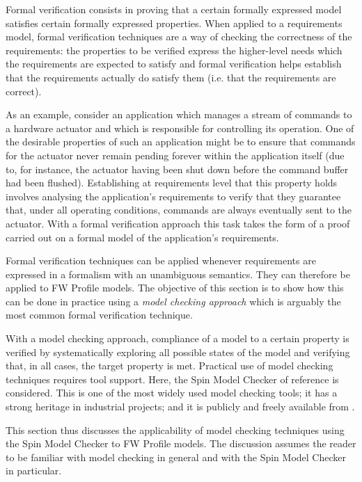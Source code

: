 \documentclass[a4paper,10pt]{article}
\begin{document}
Formal verification consists in proving that a certain formally expressed model satisfies certain formally expressed properties. When applied to a requirements model, formal verification techniques are a way of checking the correctness of the requirements: the properties to be verified express the higher-level needs which the requirements are expected to satisfy and formal verification helps establish that the requirements actually do satisfy them (i.e. that the requirements are correct). 

As an example, consider an application which manages a stream of commands to a hardware actuator and which is responsible for controlling its operation. One of the desirable properties of such an application might be to ensure that commands for the actuator never remain pending forever within the application itself (due to, for instance, the actuator having been shut down before the command buffer had been flushed). Establishing at requirements level that this property holds involves analysing the application's requirements to verify that they guarantee that, under all operating conditions, commands are always eventually sent to the actuator. With a formal verification approach this task takes the form of a proof carried out on a formal model of the application's requirements.

Formal verification techniques can be applied whenever requirements are expressed in a formalism with an unambiguous semantics. They can therefore be applied to FW Profile models. The objective of this section is to show how this can be done in practice using a \textit{model checking approach} which is arguably the most common formal verification technique. 

With a model checking approach, compliance of a model to a certain property is verified by systematically exploring all possible states of the model and verifying that, in all cases, the target property is met. Practical use of model checking techniques requires tool support. Here, the Spin Model Checker of reference \cite{ref:spinBook} is considered. This is one of the most widely used model checking tools; it has a strong heritage in industrial projects; and it is publicly and freely available from \cite{ref:spinWebSite}. 

This section thus discusses the applicability of model checking techniques using the Spin Model Checker to FW Profile models. The discussion assumes the reader to be familiar with model checking in general and with the Spin Model Checker in particular.
\end{document}
